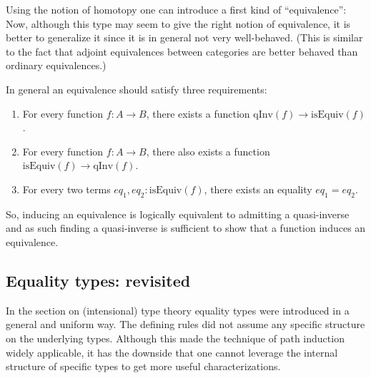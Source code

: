     Using the notion of homotopy one can introduce a first kind of ``equivalence'':
    Now, although this type may seem to give the right notion of equivalence, it is better to generalize it since it is in general not very well-behaved. (This is similar to the fact that adjoint equivalences between categories are better behaved than ordinary equivalences.)

    In general an equivalence should satisfy three requirements:
    \begin{enumerate}
        \item For every function $f:A\rightarrow B$, there exists a function $\mathrm{qInv}(f)\rightarrow\mathrm{isEquiv}(f)$.
        \item For every function $f:A\rightarrow B$, there also exists a function $\mathrm{isEquiv}(f)\rightarrow\mathrm{qInv}(f)$.
        \item For every two terms $eq_1,eq_2:\mathrm{isEquiv}(f)$, there exists an equality $eq_1=eq_2$.
    \end{enumerate}
    So, inducing an equivalence is logically equivalent to admitting a quasi-inverse and as such finding a quasi-inverse is sufficient to show that a function induces an equivalence.

\subsection{Equality types: revisited}

    In the section on (intensional) type theory equality types were introduced in a general and uniform way. The defining rules did not assume any specific structure on the underlying types. Although this made the technique of path induction widely applicable, it has the downside that one cannot leverage the internal structure of specific types to get more useful characterizations.

